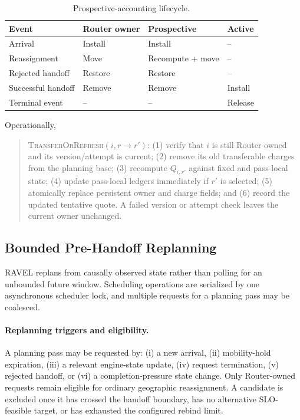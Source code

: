 \begin{table}[t]
    \centering
    \small
    \caption{Prospective-accounting lifecycle.}
    \label{tab:appendix:accounting-lifecycle}
    \setlength{\tabcolsep}{3.5pt}

    \begin{tabular}{
        @{}
        p{}
        p{}
        p{}
        p{}
        @{}
    }
        \toprule
        \textbf{Event} &
        \textbf{Router owner} &
        \textbf{Prospective} &
        \textbf{Active} \\
        \midrule
        Arrival            & Install & Install          & --      \\
        Reassignment       & Move    & Recompute + move & --      \\
        Rejected handoff   & Restore & Restore          & --      \\
        Successful handoff & Remove  & Remove           & Install \\
        Terminal event     & --      & --               & Release \\
        \bottomrule
    \end{tabular}
\end{table}
Operationally,
\begin{quote}
\textsc{TransferOrRefresh}$(i,r\!\rightarrow\!r')$:
(1) verify that $i$ is still Router-owned and its version/attempt is current;
(2) remove its old transferable charges from the planning base;
(3) recompute $Q_{i,r'}$ against fixed and pass-local state;
(4) update pass-local ledgers immediately if $r'$ is selected;
(5) atomically replace persistent owner and charge fields; and
(6) record the updated tentative quote.
A failed version or attempt check leaves the current owner unchanged.
\end{quote}


\subsection{Bounded Pre-Handoff Replanning}
\label{sec:appendix:replanning}

RAVEL replans from causally observed state rather than polling for an
unbounded future window.
Scheduling operations are serialized by one asynchronous scheduler lock, and
multiple requests for a planning pass may be coalesced.

\paragraph{Replanning triggers and eligibility.}
A planning pass may be requested by:
(i) a new arrival,
(ii) mobility-hold expiration,
(iii) a relevant engine-state update,
(iv) request termination,
(v) rejected handoff, or
(vi) a completion-pressure state change.
Only Router-owned requests remain eligible for ordinary geographic
reassignment.
A candidate is excluded once it has crossed the handoff boundary, has no
alternative SLO-feasible target, or has exhausted the configured rebind limit.

